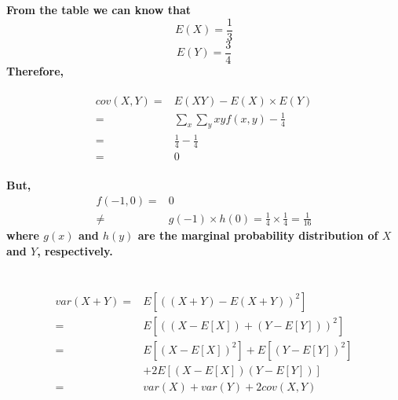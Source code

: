 \documentclass{article}
\begin{document}
    \section{}
        \paragraph{
            From the table we can know that
            $$E(X)=\frac{1}{3}$$
            $$E(Y)=\frac{3}{4}$$
            Therefore,
        }
            \begin{equation*}
                \begin{split}
                    cov(X,Y)=&E(XY)-E(X)\times E(Y)\\
                        =&\sum_x \sum_y xyf(x,y)-\frac{1}{4}\\
                        =&\frac{1}{4}-\frac{1}{4}\\
                        =&0
                \end{split}
            \end{equation*}
        \paragraph{
            But, 
            \begin{equation*}
                \begin{split}
                    f(-1,0)=&0\\
                        \neq& g(-1)\times h(0)=\frac{1}{4}\times\frac{1}{4}=\frac{1}{16}
                \end{split}
            \end{equation*}
            where $g(x)$ and $h(y)$ are the marginal probability distribution of $X$ and $Y$, respectively.
        }

    \section{}
        \begin{equation*}
            \begin{split}
                var(X+Y)=&E[((X+Y)-E(X+Y))^2]\\
                    =&E[((X-E[X])+(Y-E[Y]))^2]\\
                    =&E[(X-E[X])^2]+E[(Y-E[Y])^2]\\
                        &+2E[(X-E[X])(Y-E[Y])]\\
                    =&var(X)+var(Y)+2cov(X,Y)
            \end{split}
        \end{equation*}
\end{document}
